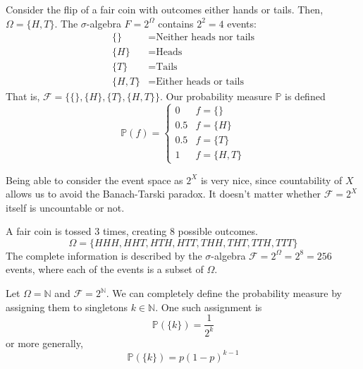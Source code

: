 \documentclass{article}
\begin{document}
      \begin{example}
        Consider the flip of a fair coin with outcomes either hands or tails. Then, $\Omega = \{H, T\}$. The $\sigma$-algebra $F = 2^{\Omega}$ contains $2^2 = 4$ events: 
        \begin{align*}
          \{\} &= \text{Neither heads nor tails} \\
          \{H\} &= \text{Heads} \\
          \{T\} &= \text{Tails} \\
          \{H, T\} &= \text{Either heads or tails}
        \end{align*}
        That is, $\mathcal{F} = \{\{\}, \{H\}, \{T\}, \{H, T\}\}$. Our probability measure $\mathbb{P}$ is defined
        \begin{equation}
          \mathbb{P}(f) = \begin{cases}
          0 & f = \{\} \\
          0.5 & f = \{H\} \\
          0.5 & f = \{T\} \\
          1 & f = \{H, T\}
          \end{cases}
        \end{equation}
      \end{example}

      Being able to consider the event space as $2^X$ is very nice, since countability of $X$ allows us to avoid the Banach-Tarski paradox. It doesn't matter whether $\mathcal{F} = 2^X$ itself is uncountable or not. 

      \begin{example}
        A fair coin is tossed 3 times, creating 8 possible outcomes. 
        \begin{equation}
          \Omega = \{HHH, HHT, HTH, HTT, THH, THT, TTH, TTT\}
        \end{equation}
        The complete information is described by the $\sigma$-algebra $\mathcal{F} = 2^{\Omega} = 2^8 = 256$ events, where each of the events is a subset of $\Omega$.  
      \end{example}

      \begin{example}
        Let $\Omega = \mathbb{N}$ and $\mathcal{F} = 2^\mathbb{N}$. We can completely define the probability measure by assigning them to singletons $k \in \mathbb{N}$. One such assignment is 
        \begin{equation}
          \mathbb{P}(\{k\}) = \frac{1}{2^k}
        \end{equation}
        or more generally, 
        \begin{equation}
          \mathbb{P}(\{k\}) = p (1 - p)^{k-1}
        \end{equation}
      \end{example}
\end{document}
